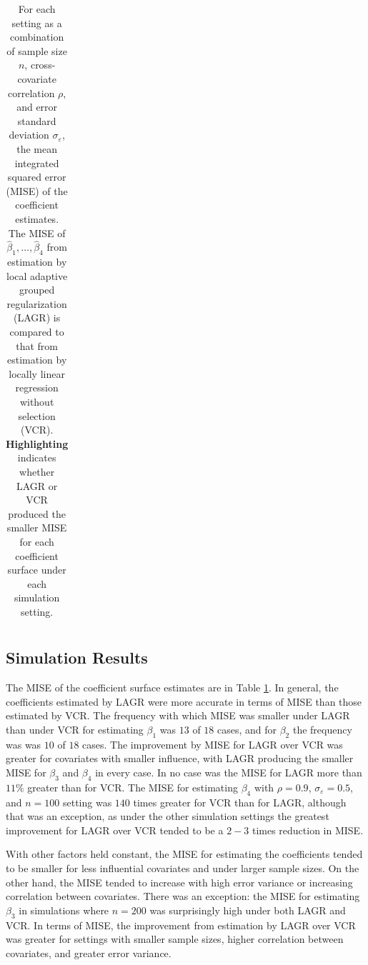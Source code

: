 \documentclass[authoryear,review, 12pt]{elsarticle}
\begin{document}
\begin{table}
\begin{tabular}{|ccc|cc|cc|cc|cc|}
	\hline
	\end{tabular}
	\caption{For each setting as a combination of sample size $n$, cross-covariate correlation $\rho$, and error standard deviation $\sigma_{\varepsilon}$, the mean integrated squared error (MISE) of the coefficient estimates.
	The MISE of $\hat{\beta}_1, \dots, \hat{\beta}_4$ from estimation by local adaptive grouped regularization (LAGR) is compared to that from estimation by locally linear regression without selection (VCR).
	\textbf{Highlighting} indicates whether LAGR or VCR produced the smaller MISE for each coefficient surface under each simulation setting.}
	\label{tab:mise}
\end{table}


\subsection{Simulation Results}

The MISE of the coefficient surface estimates are in Table \ref{tab:mise}. In general, the coefficients estimated by LAGR were more accurate in terms of MISE than those estimated by VCR. 
The frequency with which MISE was smaller under LAGR than under VCR for estimating $\beta_1$ was $13$ of $18$ cases, and for $\beta_2$ the frequency was was $10$ of $18$ cases. 
The improvement by MISE for LAGR over VCR was greater for covariates with smaller influence, with LAGR producing the smaller MISE for $\beta_3$ and $\beta_4$ in every case.
In no case was the MISE for LAGR more than $11\%$ greater than for VCR. The MISE for estimating $\beta_4$ with $\rho=0.9$, $\sigma_{\varepsilon}=0.5$, and $n=100$ setting was $140$ times greater for VCR than for LAGR, although that was an exception, as under the other simulation settings the greatest improvement for LAGR over VCR tended to be a $2-3$ times reduction in MISE.

With other factors held constant, the MISE for estimating the coefficients tended to be smaller for less influential covariates and under larger sample sizes.
On the other hand, the MISE tended to increase with high error variance or increasing correlation between covariates. 
There was an exception: the MISE for estimating $\beta_3$ in simulations where $n=200$ was surprisingly high under both LAGR and VCR.
In terms of MISE, the improvement from estimation by LAGR over VCR was greater for settings with smaller sample sizes, higher correlation between covariates, and greater error variance.
\end{document}
